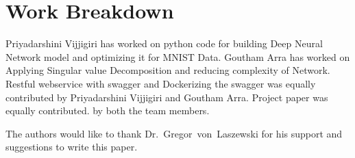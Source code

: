 \section{Work Breakdown}

Priyadarshini Vijjigiri has worked on python code for building Deep Neural
Network model and optimizing it for MNIST Data. Goutham Arra has worked on
Applying Singular value Decomposition and reducing complexity of Network.
Restful webservice with swagger and Dockerizing the swagger was equally
contributed by Priyadarshini Vijjigiri and Goutham Arra. Project paper was
equally contributed. by both the team members.



\begin{acks}

  The authors would like to thank Dr.~Gregor~von~Laszewski for his
  support and suggestions to write this paper.

\end{acks}


 




